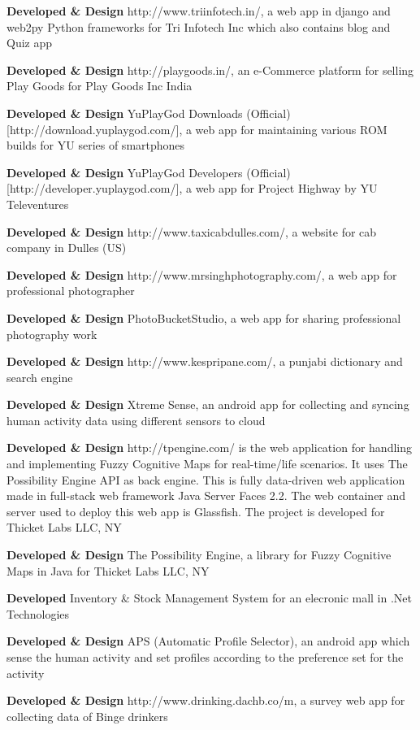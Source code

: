 \documentclass[margin,line]{res}
\begin{document}
\begin{resume}
\textbf{Developed \& Design} http://www.triinfotech.in/, a web app in django and web2py Python frameworks for Tri Infotech Inc which also contains blog and Quiz app

\textbf{Developed \& Design} http://playgoods.in/, an e-Commerce platform for selling Play Goods for Play Goods Inc India

\textbf{Developed \& Design} YuPlayGod Downloads (Official) [http://download.yuplaygod.com/], a web app for maintaining various ROM builds for YU series of smartphones

\textbf{Developed \& Design} YuPlayGod Developers (Official) [http://developer.yuplaygod.com/], a web app for Project Highway by YU Televentures

\textbf{Developed \& Design} http://www.taxicabdulles.com/, a website for cab company in Dulles (US)

\textbf{Developed \& Design} http://www.mrsinghphotography.com/, a web app for professional photographer

\textbf{Developed \& Design} PhotoBucketStudio, a web app for sharing professional photography work

\textbf{Developed \& Design} http://www.kespripane.com/, a punjabi dictionary and search engine

\textbf{Developed \& Design} Xtreme Sense, an android app for collecting and syncing human activity data using different sensors to cloud

\textbf{Developed \& Design} http://tpengine.com/ is the web application for handling and implementing Fuzzy Cognitive Maps for real-time/life scenarios. It uses The Possibility Engine API as back engine. This is fully data-driven web application made in full-stack web framework Java Server Faces 2.2. The web container and server used to deploy this web app is Glassfish. The project is developed for  Thicket Labs LLC, NY

\textbf{Developed \& Design} The Possibility Engine, a library for Fuzzy Cognitive Maps in Java for Thicket Labs LLC, NY

\textbf{Developed} Inventory \& Stock Management System for an elecronic mall in .Net Technologies

\textbf{Developed \& Design} APS (Automatic Profile Selector), an android app which sense the human activity and set profiles according to the preference set for the activity

\textbf{Developed \& Design} http://www.drinking.dachb.co/m, a survey web app for collecting data of Binge drinkers


\end{resume}
\end{document}
